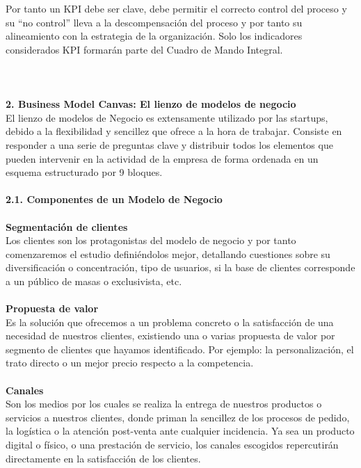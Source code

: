 \documentclass[twoside,twocolumn]{article}
\begin{document}
\begin{flushright}
\begin{itemize}
Por tanto un KPI debe ser clave, debe permitir el correcto control del proceso y su “no control” lleva a la descompensación del proceso y por tanto su alineamiento con la estrategia de la organización. Solo los indicadores considerados KPI formarán parte del Cuadro de Mando Integral.\\
\textbf{}\\
\textbf{}\\
\textbf{}\\

\textbf{2.  Business Model Canvas: El lienzo de modelos de negocio}\\
El lienzo de modelos de Negocio es extensamente utilizado por las startups, debido a la flexibilidad y sencillez que ofrece a la hora de trabajar. Consiste en responder a una serie de preguntas clave y distribuir todos los elementos que pueden intervenir en la actividad de la empresa de forma ordenada en un esquema estructurado por 9 bloques.\\
\textbf{}\\
\textbf{2.1. Componentes de un Modelo de Negocio}\\
\textbf{}\\
\textbf{Segmentación de clientes}\\
Los clientes son los protagonistas del modelo de negocio y por tanto comenzaremos el estudio definiéndolos mejor, detallando cuestiones sobre su diversificación o concentración, tipo de usuarios, si la base de clientes corresponde a un público de masas o exclusivista, etc.
\textbf{}\\\textbf{}\\
\textbf{Propuesta de valor}\\
Es la solución que ofrecemos a un problema concreto o la satisfacción de una necesidad de nuestros clientes, existiendo una o varias propuesta de valor por segmento de clientes que hayamos identificado. Por ejemplo: la personalización, el trato directo o un mejor precio respecto a la competencia.
\textbf{}\\\textbf{}\\
\textbf{Canales}\\
Son los medios por los cuales se realiza la entrega de nuestros productos o servicios a nuestros clientes, donde priman la sencillez de los procesos de pedido, la logística o la atención post-venta ante cualquier incidencia. Ya sea un producto digital o físico, o una prestación de servicio, los canales escogidos repercutirán directamente en la satisfacción de los clientes.


\end{itemize}
\end{flushright}
\end{document}
